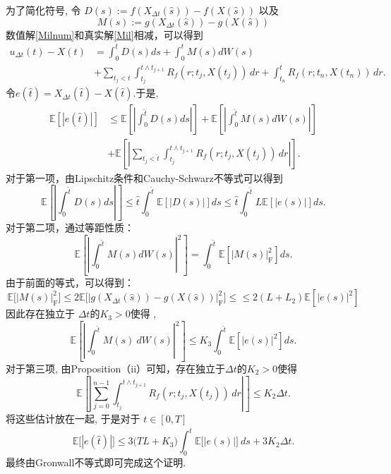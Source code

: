 \documentclass[12pt,final]{article}
\makeatletter
\theoremstyle{plain}
\renewcommand{\proofname}{proof}
\theoremstyle{Definition}
\theoremstyle{Remark}
\renewenvironment{proof}[1][\proofname]{\par
	\pushQED{\qed}%
	\normalfont \topsep6\p@\@plus6\p@\relax
	\trivlist\item[\hskip\labelsep
	\bfseries #1\@addpunct{\,:\,}]\ignorespaces
}{%
	\popQED\endtrivlist\@endpefalse
}
\makeatother
\begin{document}
	\begin{proof}
		为了简化符号, 令 $D(s):=f(X_{\Delta t}(\hat{s}))-f(X(\hat{s}))$ 以及
		$$M(s):=g(X_{\Delta t}(\hat{s}))-g(X(\hat{s}))$$
		数值解\ref{Milnum}和真实解\ref{Mil}相减，可以得到
		\begin{align}
			u_{\Delta t}(t)-X(t)& = \int_{0}^{t}D(s) ds+\int_{0}^{t}M(s) dW(s) \\
			&+\sum_{t_{j}<t}\int_{t_{j}}^{t\wedge t_{j+1}}R_{f}(r;t_{j},X(t_{j})) \, dr+\int_{t_n}^{t}R_{f}(r;t_n,X(t_{n})) \, dr. 
		\end{align}
		令$ e(\hat{t} )=X_{\Delta t}(\hat{t} )-X(\hat{t} ).  $于是,
		\begin{align}
			\mathbb{E}\left[\left|e(\hat{t})\right|\right]& \leq
			\mathbb{E}\left[\left|\int_0^{\hat{t}}D(s) ds\right|\right]+\mathbb{E}\left[\left|\int_0^{\hat{t}}M(s) dW(s)\right|\right] \\
			&+\mathbb{E}\left[\left|\sum_{t_{j}<\hat{t}}\int_{t_{j}}^{t\wedge t_{j+1}}R_{f}(r;t_{j},X(t_{j})) \, dr\right|\right].
		\end{align}
		对于第一项，由Lipschitz条件和Cauchy-Schwarz不等式可以得到
		\begin{equation}
			\mathbb{E}\left[\left|\int_{0}^{\hat{t}}D(s) ds\right|\right]\leq\hat{t}\int_{0}^{\hat{t}}\mathbb{E}\left[\left|D(s)\right|\right]ds\leq\hat{t}\int_{0}^{\hat{t}}L\mathbb{E}\left[\left|e(s)\right|\right]ds.
		\end{equation}
		对于第二项，通过等距性质：
		\begin{equation}
			\mathbb{E}\left[\left|\int_{0}^{\hat{t}}M(s) dW(s)\right|^2\right]= \int_{0}^{\hat{t}}\mathbb{E}\left[\left|M(s)\right|_{\mathrm{F}}^{2}\right]ds.  
		\end{equation}
		由于前面的等式，可以得到：
		\begin{equation}
			\mathbb{E}\Big[\left|M(s)\right|_{\mathrm{F}}^{2}\Big] \leq 2\mathbb{E}\Big[\left|g(X_{\Delta t}(\hat{s}))-g(X(\hat{s}))\right|_{\mathrm{F}}^{2}\Big] \le
			\leq2(L+L_{2}) \mathbb{E}\left[\left|e(s)\right|^2\right]
		\end{equation}
		因此存在独立于 $\Delta t$的$K_3>0$使得 ,
		$$\mathbb{E}\left[\left|\int_0^{\hat{t}}M(s)\:dW(s)\right|^2\right]\leq K_3\int_0^{\hat{t}}\mathbb{E}\left[\left|e(s)\right|^2\right]ds.$$
		对于第三项, 由Proposition（ii）可知，存在独立于$\Delta t$的$K_2>0$使得
		$$\mathbb{E}\left[\left|\sum_{j=0}^{n-1}\int_{t_{j}}^{t\wedge t_{j+1}}R_{f}(r;t_{j},X(t_{j})) \, dr\right|\right]\leq K_2\Delta t.$$
		将这些估计放在一起, 于是对于 $t\in[0,T]$
		$$\mathbb{E}\Big[\left|e(\hat{t})\right|\Big]\leq3\big(TL+K_3\big)\int_0^{\hat{t}}\mathbb{E}\Big[\left|e(s)\right|\Big]\:ds+3K_2\Delta t.$$
		最终由Gronwall不等式即可完成这个证明.

	\end{proof}


		
	
	
	
	
	
	
	
	
	
\end{document}
